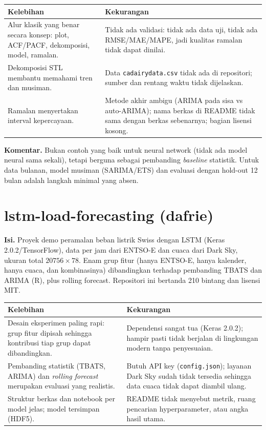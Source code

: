 \documentclass[11pt,a4paper]{article}
\newcommand{\ok}[1]{\textcolor{green!40!black}{#1}}
\newcommand{\bad}[1]{\textcolor{red!70!black}{#1}}
\begin{document}
\begin{tabular}{@{}>{\raggedright\arraybackslash}p{}>{\raggedright\arraybackslash}p{}@{}}
\toprule
\textbf{Kelebihan} & \textbf{Kekurangan} \\
\midrule
Alur klasik yang benar secara konsep: plot, ACF/PACF, dekomposisi, model, ramalan. &
\bad{Tidak ada validasi}: tidak ada data uji, tidak ada RMSE/MAE/MAPE, jadi kualitas ramalan tidak dapat dinilai. \\
Dekomposisi STL membantu memahami tren dan musiman. &
Data \texttt{cadairydata.csv} tidak ada di repositori; sumber dan rentang waktu tidak dijelaskan. \\
Ramalan menyertakan interval kepercayaan. &
Metode akhir ambigu (ARIMA pada sisa vs auto-ARIMA); nama berkas di README tidak sama dengan berkas sebenarnya; bagian lisensi kosong. \\
\bottomrule
\end{tabular}

\textbf{Komentar.} Bukan contoh yang baik untuk neural network (tidak ada model neural sama sekali), tetapi berguna sebagai pembanding \emph{baseline} statistik. Untuk data bulanan, model musiman (SARIMA/ETS) dan evaluasi dengan hold-out 12 bulan adalah langkah minimal yang absen.

\section{lstm-load-forecasting (dafrie)}
\textbf{Isi.} Proyek demo peramalan beban listrik Swiss dengan LSTM (Keras 2.0.2/TensorFlow), data per jam dari ENTSO-E dan cuaca dari Dark Sky, ukuran total $20756 \times 78$. Enam grup fitur (hanya ENTSO-E, hanya kalender, hanya cuaca, dan kombinasinya) dibandingkan terhadap pembanding TBATS dan ARIMA (R), plus rolling forecast. Repositori ini bertanda 210 bintang dan lisensi MIT.

\begin{tabular}{@{}>{\raggedright\arraybackslash}p{}>{\raggedright\arraybackslash}p{}@{}}
\toprule
\textbf{Kelebihan} & \textbf{Kekurangan} \\
\midrule
\ok{Desain eksperimen paling rapi}: grup fitur dipisah sehingga kontribusi tiap grup dapat dibandingkan. &
\bad{Dependensi sangat tua} (Keras 2.0.2); hampir pasti tidak berjalan di lingkungan modern tanpa penyesuaian. \\
Pembanding statistik (TBATS, ARIMA) dan \emph{rolling forecast} merupakan evaluasi yang realistis. &
Butuh API key (\texttt{config.json}); layanan Dark Sky sudah tidak tersedia sehingga data cuaca tidak dapat diambil ulang. \\
Struktur berkas dan notebook per model jelas; model tersimpan (HDF5). &
README tidak menyebut metrik, ruang pencarian hyperparameter, atau angka hasil utama. \\
\bottomrule
\end{tabular}
\end{document}
